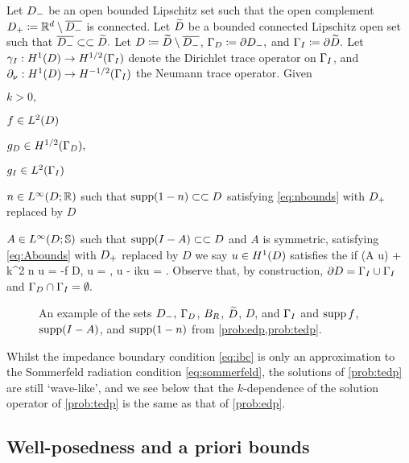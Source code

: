 \label{prob:tedp}
 Let $D_{-}$ be an open bounded Lip\-schitz set such that the open complement $D_{+} \coloneqq \mathbb R^{d} \setminus \overline{D_{-}}$ is connected. Let $\widetilde{D}$ be a bounded connected Lipschitz open set such that $\overline{D_{-}} \subset\subset \widetilde{D}.$ Let $D \coloneqq \widetilde{D} \setminus \overline{D_{-}}$, $\Gamma_{D} \coloneqq \partial D_{-},$ and $\Gamma_{I} \coloneqq \partial \widetilde{D}.$ Let $\trI: \HoD\rightarrow\HhGI$ denote the Dirichlet trace operator on $\Gamma_{I}$, and $\dn:\HoD\rightarrow\HmhGI$ the Neumann trace operator. Given
  \bit
  \item $k > 0,$
\item $f \in \LtD$
\item $\gD \in \HhGD,$
  \item $\gI \in \LtGI$
\item $n \in \LiDRR$ such that $\supp\mleft(1-n\mright) \compcont D$ satisfying \eqref{eq:nbounds} with $D_{+}$ replaced by $D$
\item $A \in \LiDRRdtd$ such that $\supp\mleft(I-A\mright)\compcont D$ and $A$ is symmetric, satisfying \eqref{eq:Abounds} with $D_{+}$ replaced by $D$
  \eit
  we say $u \in \HoD$ satisfies the  if
  \beq\label{eq:tedp}
\grad \cdot \mleft(A \grad u\mright) + k^2 n u = -f \tin D,
\eeq
\beqs
\trGD u = \gD, \ton \GD \tand
\eeqs
\beq\label{eq:ibc}
\dn u - ik\trGI u = \gI \ton \GI.
\eeq
\eprob
Observe that, by construction, $\partial D = \Gamma_{I} \cup \Gamma_{I}$ and $\Gamma_{D} \cap \Gamma_{I} = \emptyset.$

\begin{figure}
\begin{centering}

\caption[An example of the sets in the definitions of the Helmholtz Exterior Dirichlet Problem and Truncated Exterior Dirichlet Problem.]{An example of the sets $D_{-},$ $\Gamma_{D}$, $B_{R}$, {$\widetilde{D}$}, $D$, and $\Gamma_{I}$ and $\operatorname{supp} f$, $\operatorname{supp}(I-A)$, and $\operatorname{supp}(1-n)$ from \cref{prob:edp,prob:tedp}.\label{fig:domain}}
\end{centering}
\end{figure}

Whilst the impedance boundary condition \eqref{eq:ibc} is only an approximation to the Sommerfeld radiation condition \eqref{eq:sommerfeld}, the solutions of \cref{prob:tedp} are still `wave-like', and we  see below that the $k$-dependence of the solution operator of \cref{prob:tedp} is the same as that of \cref{prob:edp}.

  \subsection{Well-posedness and a priori bounds}\label{sec:wpbounds}


